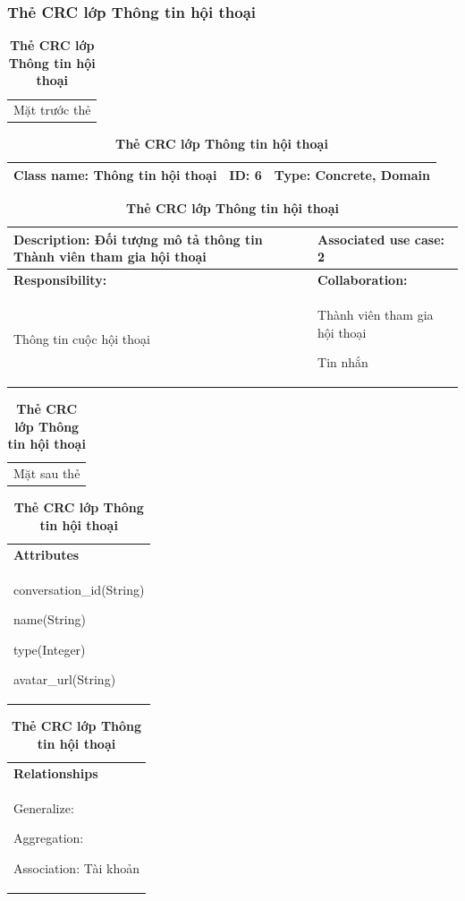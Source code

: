   \subsubsection{Thẻ CRC lớp Thông tin hội thoại}
  \begin{table}[H]
    \caption{\bfseries \fontsize{12pt}{0pt}\selectfont Thẻ CRC lớp Thông tin hội thoại}
    \centering
    \begin{tabularx}{0.9\textwidth}{X}
      Mặt trước thẻ
    \end{tabularx}
    \begin{tabularx}{0.9\textwidth}{|X|X|X|}
      \hline
      \textbf{Class name:} Thông tin hội thoại & \textbf{ID:} 6 & \textbf{Type:} Concrete, Domain \\
      \hline
    \end{tabularx}
    \begin{tabularx}{0.9\textwidth}{|X|X|}
      \textbf{Description:} Đối tượng mô tả thông tin Thành viên tham gia hội thoại & \textbf{Associated use case:} 2 \\
      \hline
      \textbf{Responsibility:} & \textbf{Collaboration:} \\
      Thông tin cuộc hội thoại
      & 
      Thành viên tham gia hội thoại 

      Tin nhắn
      \\
      \hline
    \end{tabularx}
    \begin{tabularx}{0.9\textwidth}{X}
      Mặt sau thẻ
    \end{tabularx}
    \begin{tabularx}{0.9\textwidth}{|X|}
      \hline
      \textbf{Attributes} \\
      conversation\_id(String) 
      
      name(String)

      type(Integer)

      avatar\_url(String)
      \\
      \hline
    \end{tabularx}
    \begin{tabularx}{0.9\textwidth}{|X|}
      \textbf{Relationships} \\
      Generalize:  

      Aggregation:  
      
      Association: Tài khoản 
      \\
      \hline
    \end{tabularx}
  \end{table}


